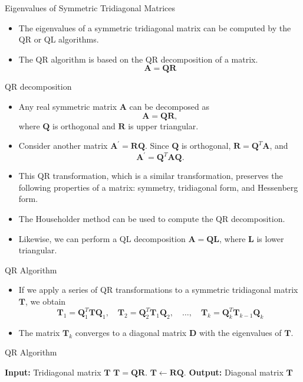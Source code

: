 \documentclass{beamer}
\begin{document}
\begin{frame}{Eigenvalues of Symmetric Tridiagonal Matrices}
    \begin{itemize}
        \item The eigenvalues of a symmetric tridiagonal matrix can be computed by the QR or QL algorithms.
        \item The QR algorithm is based on the QR decomposition of a matrix.
        \[
        \mathbf{A}=\mathbf{Q} \mathbf{R}
        \]
    \end{itemize}
\end{frame}

\begin{frame}{QR decomposition}
\begin{itemize}
    \item  Any real symmetric matrix $\mathbf{A}$ can be decomposed as 
    \[
    \mathbf{A}= \mathbf{Q} \mathbf{R},
    \]
    where $\mathbf{Q}$ is orthogonal and $\mathbf{R}$ is upper triangular.
\item Consider another matrix $\mathbf{A}^\prime=\mathbf{R} \mathbf{Q}$. Since $\mathbf{Q}$ is orthogonal, 
$\mathbf{R}= \mathbf{Q}^T \mathbf{A}$, and 
 \[
 \mathbf{A}^\prime =\mathbf{Q}^T \mathbf{A} \mathbf{Q}.
 \]
 \item This QR transformation, which is a similar transformation, preserves the following properties of
 a matrix: symmetry, tridiagonal form, and Hessenberg form.
 \item The Householder method can be used to compute the QR decomposition.
 \item Likewise, we can perform a QL decomposition $\mathbf{A}=\mathbf{Q} \mathbf{L}$, where $\mathbf{L}$ is lower triangular.
\end{itemize}
\end{frame}
\begin{frame}{QR Algorithm }
\begin{itemize}
    \item If we apply a series of QR transformations to a symmetric tridiagonal matrix $\mathbf{T}$, we obtain
    \[  
    \mathbf{T}_1=\mathbf{Q}_1^T \mathbf{T} \mathbf{Q}_1, \quad \mathbf{T}_2=\mathbf{Q}_2^T \mathbf{T}_1 \mathbf{Q}_2, \quad \ldots, \quad \mathbf{T}_k=\mathbf{Q}_k^T \mathbf{T}_{k-1} \mathbf{Q}_k
\]
\item The matrix $\mathbf{T}_k$ converges to a diagonal matrix $\mathbf{D}$ with the eigenvalues of $\mathbf{T}$.
\end{itemize}
\end{frame}
\begin{frame}{QR Algorithm}
    \begin{algorithm}[H]
        \caption{QR Algorithm for Tridiagonal Matrix}
        \begin{algorithmic}
            \State \textbf{Input:} Tridiagonal matrix $\mathbf{T}$
                \State  $\mathbf{T}=\mathbf{Q} \mathbf{R}$.
                \State $\mathbf{T} \gets \mathbf{R} \mathbf{Q}$.
            \EndWhile
            \State \textbf{Output:} Diagonal matrix $\mathbf{T}$
        \end{algorithmic}
    \end{algorithm}
\end{frame}
\end{document}
